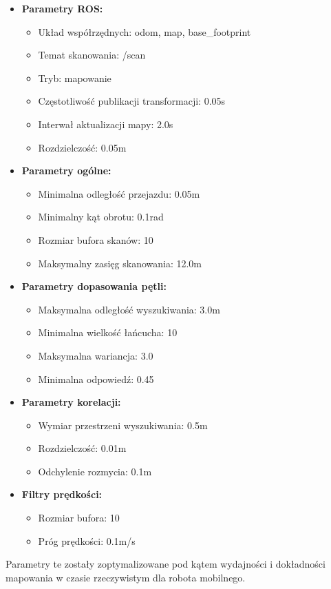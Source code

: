 \documentclass[a4paper,twoside,12pt]{book}
\begin{document}
\begin{itemize}
\begin{itemize}
	\item \textbf{Parametry ROS:}
		\begin{itemize}
		\item Układ współrzędnych: odom, map, base\_footprint
		\item Temat skanowania: /scan
		\item Tryb: mapowanie
		\item Częstotliwość publikacji transformacji: 0.05s
		\item Interwał aktualizacji mapy: 2.0s
		\item Rozdzielczość: 0.05m
		\end{itemize}

	\item \textbf{Parametry ogólne:}
		\begin{itemize}
		\item Minimalna odległość przejazdu: 0.05m
		\item Minimalny kąt obrotu: 0.1rad
		\item Rozmiar bufora skanów: 10
		\item Maksymalny zasięg skanowania: 12.0m
		\end{itemize}

	\item \textbf{Parametry dopasowania pętli:}
		\begin{itemize}
		\item Maksymalna odległość wyszukiwania: 3.0m
		\item Minimalna wielkość łańcucha: 10
		\item Maksymalna wariancja: 3.0
		\item Minimalna odpowiedź: 0.45
		\end{itemize}

	\item \textbf{Parametry korelacji:}
		\begin{itemize}
		\item Wymiar przestrzeni wyszukiwania: 0.5m
		\item Rozdzielczość: 0.01m
		\item Odchylenie rozmycia: 0.1m
		\end{itemize}

	\item \textbf{Filtry prędkości:}
		\begin{itemize}
		\item Rozmiar bufora: 10
		\item Próg prędkości: 0.1m/s
		\end{itemize}
	\end{itemize}

	Parametry te zostały zoptymalizowane pod kątem wydajności i dokładności mapowania w czasie rzeczywistym dla robota mobilnego.

\end{itemize}
\end{document}
